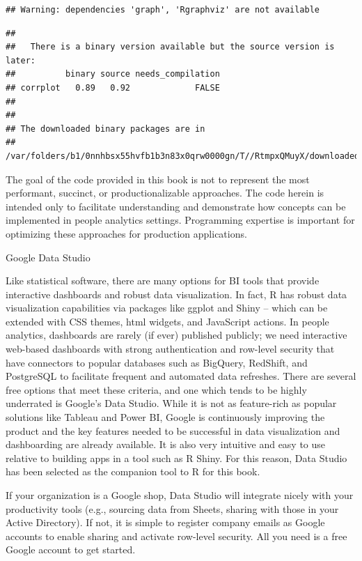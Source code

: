 \documentclass[]{book}
\begin{document}
\begin{verbatim}
## Warning: dependencies 'graph', 'Rgraphviz' are not available
\end{verbatim}

\begin{verbatim}
## 
##   There is a binary version available but the source version is later:
##          binary source needs_compilation
## corrplot   0.89   0.92             FALSE
## 
## 
## The downloaded binary packages are in
##  /var/folders/b1/0nnhbsx55hvfb1b3n83x0qrw0000gn/T//RtmpxQMuyX/downloaded_packages
\end{verbatim}

The goal of the code provided in this book is not to represent the most performant, succinct, or productionalizable approaches. The code herein is intended only to facilitate understanding and demonstrate how concepts can be implemented in people analytics settings. Programming expertise is important for optimizing these approaches for production applications.

 Google Data Studio

Like statistical software, there are many options for BI tools that provide interactive dashboards and robust data visualization. In fact, R has robust data visualization capabilities via packages like ggplot and Shiny -- which can be extended with CSS themes, html widgets, and JavaScript actions. In people analytics, dashboards are rarely (if ever) published publicly; we need interactive web-based dashboards with strong authentication and row-level security that have connectors to popular databases such as BigQuery, RedShift, and PostgreSQL to facilitate frequent and automated data refreshes. There are several free options that meet these criteria, and one which tends to be highly underrated is Google's Data Studio. While it is not as feature-rich as popular solutions like Tableau and Power BI, Google is continuously improving the product and the key features needed to be successful in data visualization and dashboarding are already available. It is also very intuitive and easy to use relative to building apps in a tool such as R Shiny. For this reason, Data Studio has been selected as the companion tool to R for this book.

If your organization is a Google shop, Data Studio will integrate nicely with your productivity tools (e.g., sourcing data from Sheets, sharing with those in your Active Directory). If not, it is simple to register company emails as Google accounts to enable sharing and activate row-level security. All you need is a free Google account to get started.
\end{document}
